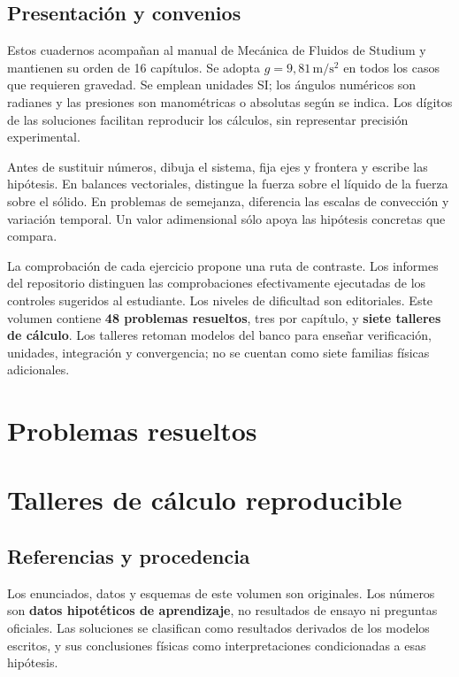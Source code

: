 \documentclass[10pt,a4paper,openany]{book}
\begin{document}
\frontmatter
\studiumreadingguide
\chapter*{Presentación y convenios}
Estos cuadernos acompañan al manual de Mecánica de Fluidos de Studium y mantienen su orden de 16 capítulos. Se adopta $g=9{,}81\,\mathrm{m/s^2}$ en todos los casos que requieren gravedad. Se emplean unidades SI; los ángulos numéricos son radianes y las presiones son manométricas o absolutas según se indica. Los dígitos de las soluciones facilitan reproducir los cálculos, sin representar precisión experimental.

Antes de sustituir números, dibuja el sistema, fija ejes y frontera y escribe las hipótesis. En balances vectoriales, distingue la fuerza sobre el líquido de la fuerza sobre el sólido. En problemas de semejanza, diferencia las escalas de convección y variación temporal. Un valor adimensional sólo apoya las hipótesis concretas que compara.

La comprobación de cada ejercicio propone una ruta de contraste. Los informes del repositorio distinguen las comprobaciones efectivamente ejecutadas de los controles sugeridos al estudiante. Los niveles de dificultad son editoriales.
\noindent Este volumen contiene \textbf{48 problemas resueltos}, tres por capítulo, y \textbf{siete talleres de cálculo}. Los talleres retoman modelos del banco para enseñar verificación, unidades, integración y convergencia; no se cuentan como siete familias físicas adicionales.
\tableofcontents
\listoffigures
\mainmatter
\part{Problemas resueltos}

\part{Talleres de cálculo reproducible}


\backmatter
\chapter*{Referencias y procedencia}
Los enunciados, datos y esquemas de este volumen son originales. Los números son \textbf{datos hipotéticos de aprendizaje}, no resultados de ensayo ni preguntas oficiales. Las soluciones se clasifican como resultados derivados de los modelos escritos, y sus conclusiones físicas como interpretaciones condicionadas a esas hipótesis.
\end{document}
